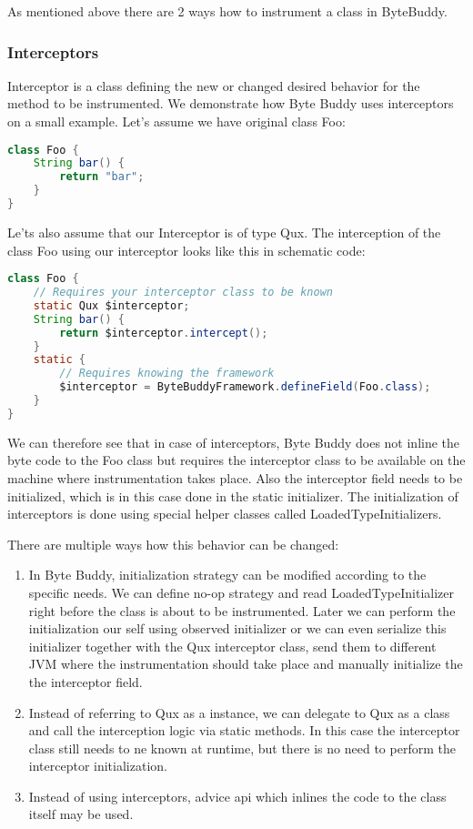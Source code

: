 As mentioned above there are 2 ways how to instrument a class in ByteBuddy.
\subsubsection{Interceptors}
Interceptor is a class defining the new or changed desired behavior for the method to be instrumented. 
We demonstrate how Byte Buddy uses interceptors on a small example. Let's assume we have original class Foo:
\begin{lstlisting}[language=Java]
class Foo {
	String bar() {
		return "bar"; 
	}
}
\end{lstlisting}
	
Le'ts also assume that our Interceptor is of type Qux. The interception of the class Foo using our interceptor looks like this in schematic code:

\begin{lstlisting}[language=Java]
class Foo {
	// Requires your interceptor class to be known
	static Qux $interceptor;
	String bar() {
		return $interceptor.intercept(); 
	}
	static {
		// Requires knowing the framework
		$interceptor = ByteBuddyFramework.defineField(Foo.class);
	}
}
\end{lstlisting}
		
We can therefore see that in case of interceptors, Byte Buddy does not inline the byte code to the Foo class but requires the interceptor class to be available on the machine where instrumentation takes place. Also the interceptor field needs to be initialized, which is in this case done in the static initializer. The initialization of interceptors is done using special helper classes called LoadedTypeInitializers.

There are multiple ways how this behavior can be changed:
\begin{enumerate}
\item In Byte Buddy, initialization strategy can be modified according to the specific needs. We can define no-op strategy and read LoadedTypeInitializer right before the class is about to be instrumented.  Later we can perform the initialization our self using observed initializer or we can even serialize this initializer together with the Qux interceptor class, send them to different JVM where the instrumentation should take place and manually initialize the the interceptor field.
\item Instead of referring to Qux as a instance, we can delegate to Qux as a class and call the interception logic via static methods. In this case the interceptor class still needs to ne known at runtime, but there is no need to perform the interceptor initialization.
\item Instead of using interceptors, advice api which inlines the code to the class itself may be used.
\end{enumerate}
